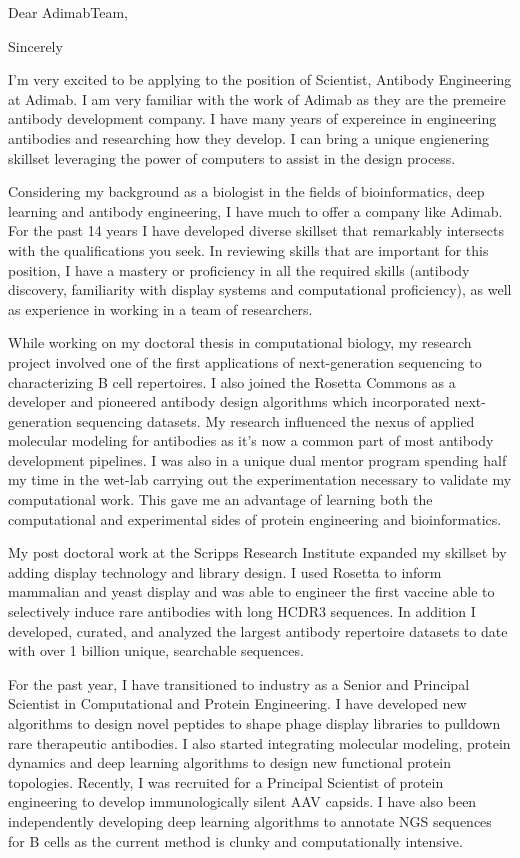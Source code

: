 \documentclass[11pt,a4paper,sans]{moderncv}        %
\title{}                               %
\newcommand{\Position}{Scientist, Antibody Engineering }
\newcommand{\Company}{Adimab}
\newcommand{\CompanyLoc}{Lebanon}
\newcommand{\CompanyState}{NH}
\newcommand{\Personal}{I am very familiar with the work of Adimab as they are the premeire antibody development company. I have many years of expereince in engineering antibodies and researching how they develop. I can bring a unique engienering skillset leveraging the power of computers to assist in the design process.}
\newcommand{\skills}{antibody discovery, familiarity with display systems and computational proficiency}
\begin{document}
\recipient{\Company Team}{\CompanyLoc \\ \CompanyLoc, \CompanyState}
\date{2020}
\opening{Dear \Company Team,}
\closing{Sincerely}
\makelettertitle
\justify
I'm very excited to be applying to the position of \Position at \Company. \Personal

Considering my background as a biologist in the fields of bioinformatics, deep learning and antibody engineering, I have much to offer a company like \Company.
For the past 14 years I have developed diverse skillset that remarkably intersects with the qualifications you seek. In reviewing skills that are important for this position, I have a mastery or proficiency in all the required skills (\skills), as well as experience in working in a team of researchers.

While working on my doctoral thesis in computational biology, my research project involved one of the first applications of next-generation sequencing to characterizing B cell repertoires. 
I also joined the Rosetta Commons as a developer and pioneered antibody design algorithms which incorporated next-generation sequencing datasets. My research influenced the nexus of applied molecular modeling for antibodies as it's now a common part of most antibody development pipelines. I was also in a unique dual mentor program spending half my time in the wet-lab carrying out the experimentation necessary to validate my computational work. This gave me an advantage of learning both the computational and experimental sides of protein engineering and bioinformatics.

My post doctoral work at the Scripps Research Institute expanded my skillset by adding display technology and library design. I used Rosetta to inform mammalian and yeast  display and was able to engineer the first vaccine able to selectively induce rare antibodies with long HCDR3 sequences.  In addition I developed, curated, and analyzed the largest antibody repertoire datasets to date with over 1 billion unique, searchable sequences.

For the past year, I have transitioned to industry as a Senior and Principal Scientist in Computational and Protein Engineering. I have developed new algorithms to design novel peptides to shape phage display libraries to pulldown rare therapeutic antibodies. I also started integrating molecular modeling, protein dynamics and deep learning algorithms to design new functional protein topologies. Recently, I was recruited for a Principal Scientist of protein engineering to develop immunologically silent AAV capsids. I have also been independently developing deep learning algorithms to annotate NGS sequences for B cells as the current method is clunky and computationally intensive.
\end{document}
